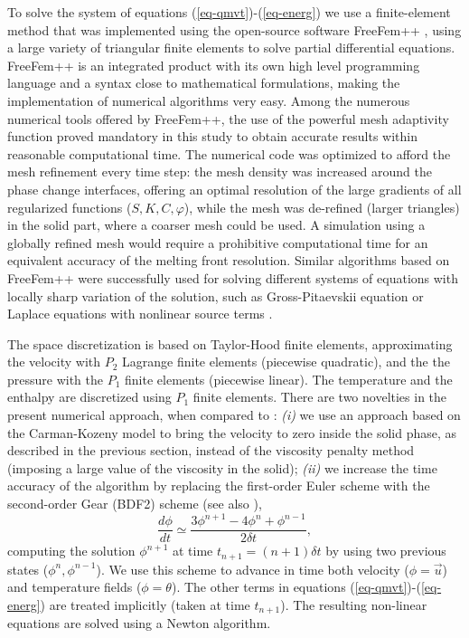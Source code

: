 To solve the system of equations (\ref{eq-qmvt})-(\ref{eq-energ}) we use a finite-element method that was implemented using the open-source software FreeFem++ \citep{freefem,hecht-2012-JNM}, using a large variety of triangular finite elements  to solve partial differential equations. FreeFem++  is an integrated product with its own high level programming language and a syntax close to mathematical formulations, making the implementation of numerical algorithms very easy. Among the numerous numerical tools offered by FreeFem++, the use of the powerful mesh adaptivity function proved mandatory in this study to obtain accurate results within reasonable computational time.
The numerical code was optimized to afford the mesh refinement every time step:  the mesh density was increased around  the phase change interfaces,  offering an optimal resolution of the large gradients of all regularized functions ($S, K, C, \varphi$), while  the mesh was de-refined (larger triangles) in the solid part, where a coarser mesh could be used. A simulation using a globally refined mesh would require a prohibitive computational time for an equivalent accuracy of the melting front resolution. Similar algorithms based on FreeFem++  were successfully used for solving different systems of equations with locally sharp variation of the solution, such as Gross-Pitaevskii equation \citep{dan-2010-JCP,dan-2016-CPC} or  Laplace equations with nonlinear source terms \citep{dan-2013-AMM}. 

The space discretization is based on Taylor-Hood finite elements, approximating  the velocity with $P_{2}$ Lagrange finite elements (piecewise quadratic), and the
the pressure with the $P_{1}$ finite elements (piecewise linear). The temperature and the enthalpy are discretized using $P_1$ finite elements.  
There are two novelties in the present numerical approach, when compared to  \cite{dan-2014-JCP}: 
{\em (i)} we use an approach based on the Carman-Kozeny model to bring the velocity to zero inside the solid phase, as described in the previous section, instead of the  viscosity penalty method (imposing a large value of the viscosity in the solid);
{\em (ii)} we increase  the time accuracy of the algorithm by replacing the first-order Euler scheme with the second-order Gear (BDF2) scheme (see also \cite{Belhamadia2012}),
\begin{equation}	
\label{eq-Gear}
	\frac{d\phi}{dt} \simeq \frac{3\phi^{n+1} - 4\phi^{n}+ \phi^{n-1}}{2\delta t},
\end{equation}
computing the solution $\phi^{n+1}$ at time  $t_{n+1}=(n+1) \delta t$ by using two previous states ($\phi^{n}, \phi^{n-1}$). We use this scheme to advance in time both velocity ($\phi=\vec{u}$) and temperature fields  ($\phi=\theta$).  The other terms in equations (\ref{eq-qmvt})-(\ref{eq-energ}) are treated implicitly (\ie taken at time $t_{n+1}$). The resulting non-linear equations are solved using a Newton algorithm. 

